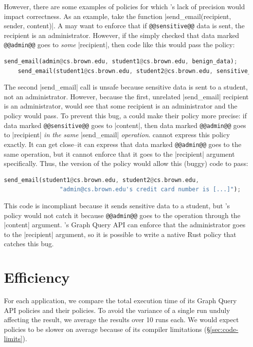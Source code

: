However, there are some examples of policies for which \syslang's lack of precision would impact correctness.
%
As an example, take the function |send_email(recipient, sender, content)|.
%
A \ce{} may want to enforce that if \lstinline[language=CNL]|@@sensitive@@| data is sent,
the recipient is an administrator.
%
However, if the \ce{} simply checked that data marked \lstinline[language=CNL]|@@admin@@| goes to \emph{some} |recipient|,
then code like this would pass the policy:
\begin{lstlisting}[language=Rust]
    send_email(admin@cs.brown.edu, student1@cs.brown.edu, benign_data);
    send_email(student1@cs.brown.edu, student2@cs.brown.edu, sensitive_data);
\end{lstlisting}
The second |send_email| call is unsafe because sensitive data is sent to a student, not an administrator.
%
However, because the first, unrelated |send_email| recipient is an administrator, 
\sys{} would see that some recipient is an administrator and the policy would pass.
%
To prevent this bug, a \ce{} could make their policy more precise: if data marked \lstinline[language=CNL]|@@sensitive@@| goes to |content|,
then data marked \lstinline[language=CNL]|@@admin@@| goes to |recipient| \emph{in the same} |send_email| \emph{operation}.
%
\syslang{} cannot express this policy exactly.
%
It can get close--it can express that data marked \lstinline[language=CNL]|@@admin@@| goes to the same operation,
but it cannot enforce that it goes to the |recipient| argument specifically.
%
Thus, the \syslang{} version of the policy would allow this (buggy) code to pass:
\begin{lstlisting}[language=Rust]
    send_email(student1@cs.brown.edu, student2@cs.brown.edu, 
                "admin@cs.brown.edu's credit card number is [...]");
\end{lstlisting}
%
This code is incompliant because it sends sensitive data to a student,
but \syslang{}'s policy would not catch it because \lstinline[language=CNL]|@@admin@@| goes to 
the operation through the |content| argument.
%
\sys{}'s Graph Query API can enforce that the administrator goes to the |recipient| argument,
so it is possible to write a native Rust policy that catches this bug.

\section{Efficiency}
\label{sec:efficiency}
For each application, we compare the total execution time of its Graph Query API policies
and their \syslang{} policies.
%
To avoid the variance of a single run unduly affecting the result, we average the results over 10 runs each.
%
We would expect \syslang{} policies to be slower on average because of its compiler limitations (\S\ref{sec:code-limits}).


